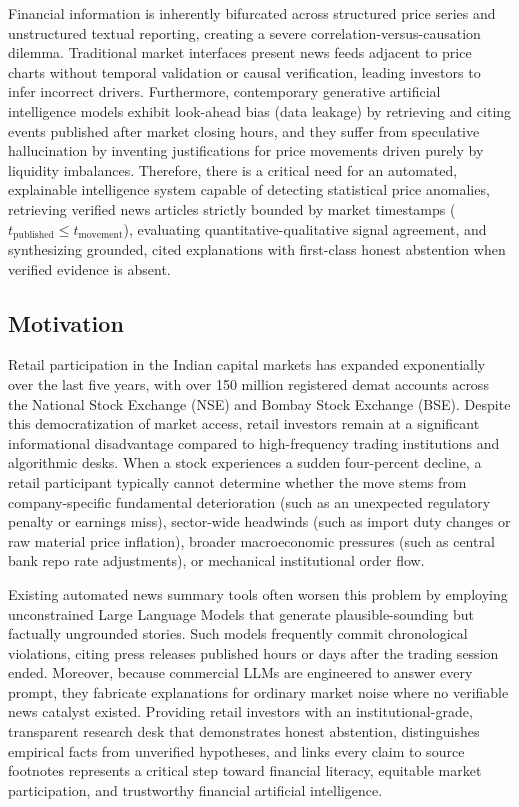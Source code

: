 \documentclass{article}
\begin{document}
	Financial information is inherently bifurcated across structured price series and unstructured textual reporting, creating a severe correlation-versus-causation dilemma. Traditional market interfaces present news feeds adjacent to price charts without temporal validation or causal verification, leading investors to infer incorrect drivers. Furthermore, contemporary generative artificial intelligence models exhibit look-ahead bias (data leakage) by retrieving and citing events published after market closing hours, and they suffer from speculative hallucination by inventing justifications for price movements driven purely by liquidity imbalances. Therefore, there is a critical need for an automated, explainable intelligence system capable of detecting statistical price anomalies, retrieving verified news articles strictly bounded by market timestamps ($t_{\text{published}} \le t_{\text{movement}}$), evaluating quantitative-qualitative signal agreement, and synthesizing grounded, cited explanations with first-class honest abstention when verified evidence is absent.

	\subsection{Motivation}

	Retail participation in the Indian capital markets has expanded exponentially over the last five years, with over 150 million registered demat accounts across the National Stock Exchange (NSE) and Bombay Stock Exchange (BSE). Despite this democratization of market access, retail investors remain at a significant informational disadvantage compared to high-frequency trading institutions and algorithmic desks. When a stock experiences a sudden four-percent decline, a retail participant typically cannot determine whether the move stems from company-specific fundamental deterioration (such as an unexpected regulatory penalty or earnings miss), sector-wide headwinds (such as import duty changes or raw material price inflation), broader macroeconomic pressures (such as central bank repo rate adjustments), or mechanical institutional order flow.

	Existing automated news summary tools often worsen this problem by employing unconstrained Large Language Models that generate plausible-sounding but factually ungrounded stories. Such models frequently commit chronological violations, citing press releases published hours or days after the trading session ended. Moreover, because commercial LLMs are engineered to answer every prompt, they fabricate explanations for ordinary market noise where no verifiable news catalyst existed. Providing retail investors with an institutional-grade, transparent research desk that demonstrates honest abstention, distinguishes empirical facts from unverified hypotheses, and links every claim to source footnotes represents a critical step toward financial literacy, equitable market participation, and trustworthy financial artificial intelligence.
\end{document}
